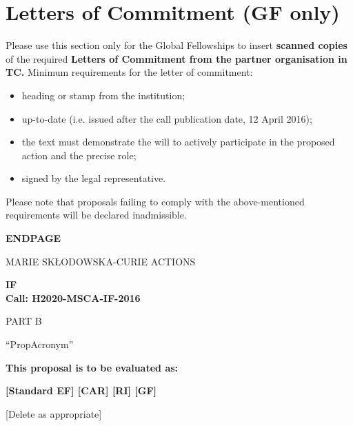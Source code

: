 \newpage
\section{Letters of Commitment (GF only)}
\label{sec:letters}

Please use this section only for the Global Fellowships to insert {\bf scanned copies} of the required {\bf Letters of Commitment from the partner organisation in TC.} 
Minimum requirements for the letter of commitment: 

\begin{itemize}
  \item heading or stamp from the institution; 
  \item up-to-date (i.e. issued after the call publication date, 12 April 2016); 
  \item the text must demonstrate the will to actively participate in the proposed action and the precise role;
  \item signed by the legal representative.
\end{itemize}


\medskip\noindent
Please note that proposals failing to comply with the above-mentioned requirements will be declared inadmissible.





\newpage
\label{sec:endpage}
\vspace{15mm}
\begin{center}


        \Large{
      
     
        \textbf{ENDPAGE}
  
          \vspace{15mm}
          MARIE SK\L{}ODOWSKA-CURIE ACTIONS\\
          \vspace{1cm}
          
          \textbf{\acf{IF}}\\
          \textbf{Call: H2020-MSCA-IF-2016}
          \vspace{2cm}                   

          PART B
          \vspace{2.5cm}

          ``{\sc \ac{PropAcronym}\xspace}''
          \vspace{2cm}

          \textbf{This proposal is to be evaluated as:}
          \vspace{.5cm}

          \textbf{[Standard EF] [CAR] [RI] [GF]}\\
        }
        \large{[Delete as appropriate]}

  \end{center}
\vspace{1cm}
